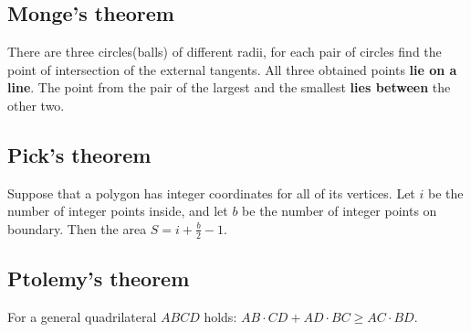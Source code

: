 \subsection{Monge's theorem}
There are three circles(balls) of different radii, 
for each pair of circles find the point of intersection of the external tangents. 
All three obtained points \textbf{lie on a line}. 
The point from the pair of the largest and the smallest \textbf{lies between} the other two.

\subsection{Pick's theorem}
Suppose that a polygon has integer coordinates for all of its vertices. 
Let $i$ be the number of integer points inside, and let $b$ be the number of integer points on boundary. 
Then the area $S = i + \tfrac{b}{2} - 1$.

\subsection{Ptolemy's theorem}
For a general quadrilateral $ABCD$ holds:
$AB \cdot CD + AD \cdot BC \ge AC \cdot BD$.

